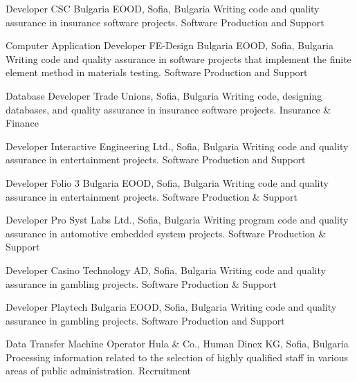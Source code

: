\documentclass[english,a4paper]{europasscv}
\begin{document}
\begin{europasscv}
   {Developer}
  \ecvitem {} {CSC Bulgaria EOOD, Sofia, Bulgaria}
  \ecvitem {} {Writing code and quality assurance in insurance software projects.}
  \ecvitem {} { \quad Software Production and Support}
  
   {Computer Application Developer}
  \ecvitem {} {FE-Design Bulgaria EOOD, Sofia, Bulgaria}
  \ecvitem {} {Writing code and quality assurance in software projects that implement the finite element method in materials testing.}
  \ecvitem {} { \quad Software Production and Support}
  
   {Database Developer}
  \ecvitem {} {Trade Unions, Sofia, Bulgaria}
  \ecvitem {} {Writing code, designing databases, and quality assurance in insurance software projects.}
  \ecvitem {} { \quad Insurance \& Finance}
  
   {Developer}
  \ecvitem {} {Interactive Engineering Ltd., Sofia, Bulgaria}
  \ecvitem {} {Writing code and quality assurance in entertainment projects.}
  \ecvitem {} { \quad Software Production and Support}
  
   {Developer}
  \ecvitem {} {Folio 3 Bulgaria EOOD, Sofia, Bulgaria}
  \ecvitem {} {Writing code and quality assurance in entertainment projects.}
  \ecvitem {} { \quad Software Production \& Support}
  
   {Developer}
  \ecvitem {} {Pro Syst Labs Ltd., Sofia, Bulgaria}
  \ecvitem {} {Writing program code and quality assurance in automotive embedded system projects.}
  \ecvitem {} { \quad Software Production \& Support}
  
   {Developer}
  \ecvitem {} {Casino Technology AD, Sofia, Bulgaria}
  \ecvitem {} {Writing code and quality assurance in gambling projects.}
  \ecvitem {} { \quad Software Production \& Support}

   {Developer}
  \ecvitem {} {Playtech Bulgaria EOOD, Sofia, Bulgaria}
  \ecvitem {} {Writing code and quality assurance in gambling projects.}
  \ecvitem {} { \quad Software Production and Support}
  
   {Data Transfer Machine Operator}
  \ecvitem {} {Hula \& Co., Human Dinex KG, Sofia, Bulgaria}
  \ecvitem {} {Processing information related to the selection of highly qualified staff in various areas of public administration.}
  \ecvitem {} { \quad Recruitment}
  

\end{europasscv}
\end{document}
